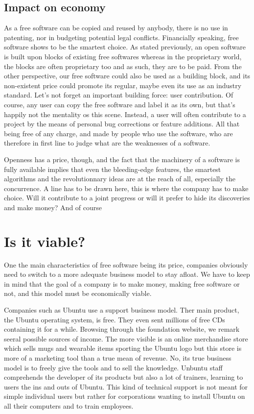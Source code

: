 \documentclass[12pt]{article}
\begin{document}
\subsection{Impact on economy}

As a free software can be copied and reused by anybody, there is no
use in patenting, nor in budgeting potential legal
conflicts. Financially speaking, free software shows to be the
smartest choice. As stated previously, an open software is built upon
blocks of existing free softwares whereas in the proprietary world,
the blocks are often proprietary too and as such, they are to be
paid. From the other perspective, our free software could also be used
as a building block, and its non-existent price could promote its
regular, maybe even its use as an industry standard. Let's not forget
an important building force: user contribution. Of course, any user
can copy the free software and label it as its own, but that's happily
not the mentality os this scene. Instead, a user will often contribute
to a project by the means of personal bug corrections or feature
additions. All that being free of any charge, and made by people who
use the software, who are therefore in first line to judge what are
the weaknesses of a software.

Openness has a price, though, and the fact that the machinery of a
software is fully available implies that even the bleeding-edge
features, the smartest algorithms and the revolutionnary ideas are at
the reach of all, especially the concurrence. A line has to be drawn
here, this is where the company has to make choice. Will it contribute
to a joint progress or will it prefer to hide its discoveries and make
money? And of course

\section{Is it viable?}

One the main characteristics of free software being its price,
companies obviously need to switch to a more adequate business model
to stay afloat. We have to keep in mind that the goal of a company is
to make money, making free software or not, and this model must be
economically viable.

Companies such as Ubuntu use a support business model. Ther main
product, the Ubuntu operating system, is free. They even sent millions
of free CDs containing it for a while. Browsing through the foundation
website, we remark seeral possible sources of income. The more visible
is an online merchandise store which sells mugs and wearable items
sporting the Ubuntu logo but this store is more of a marketing tool
than a true mean of revenue. No, its true business model is to freely
give the tools and to sell the knowledge. Unbuntu staff comprehends
the developer of its products but also a lot of trainers, learning to
users the ins and outs of Ubuntu. This kind of technical support is
not meant for simple individual users but rather for corporations
wanting to install Ubuntu on all their computers and to train
employees.
\end{document}
